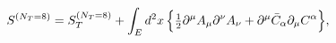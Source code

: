 \begin{equation}
\label{3.1}
S^{(N_T = 8)} = S_T^{(N_T = 8)} + \int_E d^2x\, \Bigr\{
\hbox{$\frac{1}{2}$} \partial^\mu A_\mu \partial^\nu A_\nu +
\partial^\mu \bar{C}_\alpha \partial_\mu C^\alpha \Bigr\},
\end{equation}

